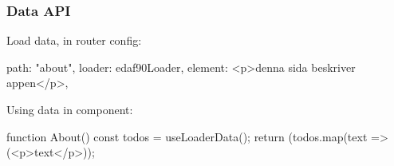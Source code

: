\begin{frame}[fragile] \frametitle{Data API}

Load data, in router config:
\begin{CodeBox}{}
{
  path: "about",
  loader: edaf90Loader,
  element: <p>denna sida beskriver appen</p>,
}
\end{CodeBox}
\vspace{1mm}
Using data in component:
\begin{CodeBox}{}
function About() {
  const todos = useLoaderData();
  return (todos.map(text => (<p>{text}</p>));
}
\end{CodeBox}

\end{frame}
